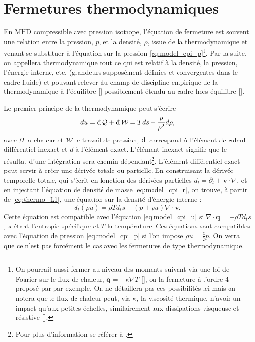 \section{Fermetures thermodynamiques}
\label{sec-122}
En MHD compressible avec pression isotrope, l'équation de fermeture est souvent une relation entre la pression, $p$, et la densité, $\rho$, issue de la thermodynamique et venant se substituer à l'équation sur la pression \eqref{eq:model_cpi_p}\footnote{On pourrait aussi fermer au niveau des moments suivant via une loi de Fourier sur le flux de chaleur, $\boldsymbol{q} = - \kappa \nabla T$ [\cite{belmont_introduction_2018}], ou la fermeture à l'ordre 4 proposé par \cite{chust_closure_2006} par exemple. On ne détaillera pas ces possibilités ici mais on notera que le flux de chaleur peut, via $\kappa$, la viscosité thermique, n'avoir un impact qu'aux petites échelles, similairement aux dissipations visqueuse et résistive [\cite{eyink_cascades_2018}].}. Par la suite, on appellera thermodynamique tout ce qui est relatif à la densité, la pression, l'énergie interne, etc. (grandeurs supposément définies et convergentes dans le cadre fluide) et pouvant relever du champ de discipline empirique de la thermodynamique à l'équilibre [\cite{borel_thermodynamique_2005}]  possiblement étendu au cadre hors équilibre [\cite{livadiotis_non-equilibrium_2012}].

Le premier principe de la thermodynamique peut s'écrire 
\begin{equation}
\label{eq:thermo_L1} du =  \dj \mathcal{Q} + \dj \mathcal{W} = Tds + \frac{p}{\rho^2} d\rho,
\end{equation}
avec $\mathcal{Q}$ la chaleur et $\mathcal{W}$ le travail de pression, $\dj$ correspond à l'élément de calcul différentiel inexact et $d$ à l'élément exact. L'élément inexact signifie que le résultat d'une intégration sera chemin-dépendant\footnote{Pour plus d'information se référer à \cite{borel_thermodynamique_2005}.}. L'élément différentiel exact peut servir à créer une dérivée totale ou partielle. En construisant la dérivée temporelle totale, qui s'écrit en fonction des dérivées partielles $d_t = \partial_t + \boldsymbol{v} \cdot \nabla $, et en injectant l'équation de densité de masse \eqref{eq:model_cpi_r}, on trouve, à partir de \eqref{eq:thermo_L1}, une équation sur la densité d'énergie interne : 
\begin{equation}
\label{eq:thermo_u}   d_t \left(\rho u\right) = \rho T d_t s - \left(p+\rho u\right)\nabla \cdot \boldsymbol{v}.
\end{equation}
Cette équation est compatible avec l'équation \eqref{eq:model_cpi_u} si $\nabla \cdot \mathbf{q} = - \rho T d_t s$, $s$ étant l'entropie spécifique et $T$ la température. Ces équations sont compatibles avec l'équation de pression \eqref{eq:model_cpi_p} si l'on impose $\rho u = \frac{3}{2} p$. On verra que ce n'est pas forcément le cas avec les fermetures de type thermodynamique. 

